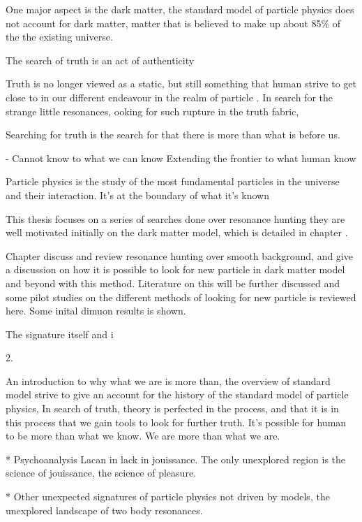 One major aspect is the dark matter, the standard model of particle physics does not account for dark matter, matter that is believed to make up about 85\% of the the existing universe.  


The search of truth is an act of authenticity

Truth is no longer viewed as a static, but still something that human strive to get close to in our different endeavour in the realm of particle . 
In search for the strange little resonances, ooking for such rupture in the truth fabric, 

Searching for truth is the search for that there is more than what is before us. 



- Cannot know to what we can know
Extending the frontier to what human know 

Particle physics is the study of the most fundamental particles in the universe and their interaction. It's at the boundary of what it's known

This thesis focuses on a series of searches done over resonance hunting 
they are well motivated initially on the dark matter model, which is detailed in chapter . 

Chapter discuss and review resonance hunting over smooth background, and give a discussion on how it is possible to look for new particle in dark matter model and beyond with this method.
Literature on this will be further discussed and some pilot studies on the different methods of looking for new particle is reviewed here. Some inital dimuon results is shown. 

The signature itself and i

2. 

An introduction to why what we are is more than, the overview of standard model strive to give an account for the history of the standard model of particle physics, 
In search of truth, theory is perfected in the process, and that it is in this process that we gain tools to look for further truth.
It's possible for human to be more than what we know. We are more than what we are. 

* Psychoanalysis 
Lacan in lack in jouissance. 
The only unexplored region is the science of jouissance, the science of pleasure. 

* Other unexpected signatures of particle physics not driven by models, the unexplored landscape of two body resonances. 



